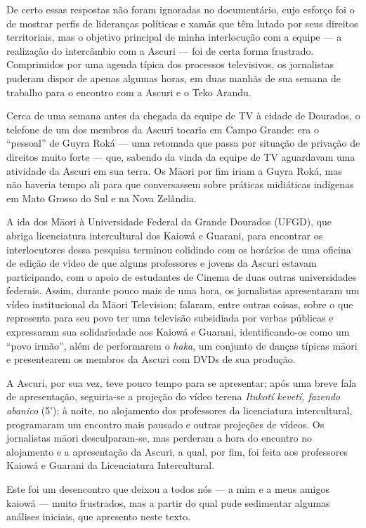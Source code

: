 De certo essas respostas não foram ignoradas no documentário, cujo
esforço foi o de mostrar perfis de lideranças políticas e xamãs que têm
lutado por seus direitos territoriais, mas o objetivo principal de minha
interlocução com a equipe --- a realização do intercâmbio com a Ascuri
--- foi de certa forma frustrado. Comprimidos por uma agenda típica dos
processos televisivos, os jornalistas puderam dispor de apenas algumas
horas, em duas manhãs de sua semana de trabalho para o encontro com a
Ascuri e o Teko Arandu.

Cerca de uma semana antes da chegada da equipe de TV à cidade de
Dourados, o telefone de um dos membros da Ascuri tocaria em Campo
Grande: era o ``pessoal'' de Guyra Roká --- uma retomada que passa por
situação de privação de direitos muito forte --- que, sabendo da vinda
da equipe de TV aguardavam uma atividade da Ascuri em sua terra. Os
Māori por fim iriam a Guyra Roká, mas não haveria tempo ali para que
conversassem sobre práticas midiáticas indígenas em Mato Grosso do Sul e
na Nova Zelândia.

A ida dos Māori à Universidade Federal da Grande Dourados (UFGD), que
abriga licenciatura intercultural dos Kaiowá e Guarani, para encontrar
os interlocutores dessa pesquisa terminou colidindo com os horários de
uma oficina de edição de vídeo de que alguns professores e jovens da
Ascuri estavam participando, com o apoio de estudantes de Cinema de duas
outras universidades federais. Assim, durante pouco mais de uma hora, os
jornalistas apresentaram um vídeo institucional da Māori Television;
falaram, entre outras coisas, sobre o que representa para seu povo ter
uma televisão subsidiada por verbas públicas e expressaram sua
solidariedade aos Kaiowá e Guarani, identificando-os como um ``povo
irmão'', além de performarem o \emph{haka}, um conjunto de danças
típicas māori e presentearem os membros da Ascuri com DVDs de sua
produção.

A Ascuri, por sua vez, teve pouco tempo para se apresentar; após uma
breve fala de apresentação, seguiria-se a projeção do vídeo terena
\emph{Itukotí kevetí, fazendo abanico} (5'); à noite, no alojamento dos
professores da licenciatura intercultural, programaram um encontro mais
pausado e outras projeções de vídeos. Os jornalistas māori
desculparam-se, mas perderam a hora do encontro no alojamento e a
apresentação da Ascuri, a qual, por fim, foi feita aos professores
Kaiowá e Guarani da Licenciatura Intercultural.

Este foi um desencontro que deixou a todos nós --- a mim e a meus amigos
kaiowá --- muito frustrados, mas a partir do qual pude sedimentar
algumas análises iniciais, que apresento neste texto.

